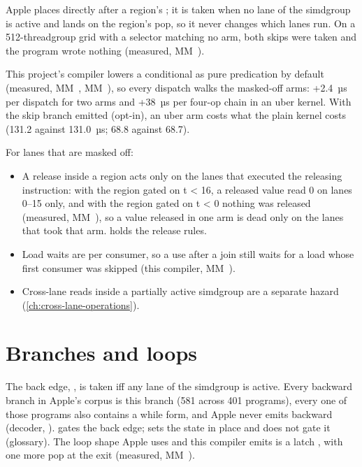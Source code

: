 Apple places 
directly after a region's ; it is taken when no lane of the simdgroup is active and lands
on the region's pop, so it never changes which lanes run. On a 512-threadgroup grid with a selector matching no arm, both skips were taken and the program wrote
nothing (measured, MM~).

This project's compiler lowers a
conditional as pure predication by default (measured, MM~, MM~), so every dispatch walks the masked-off arms: +2.4~µs per dispatch for two arms
and +38~µs per four-op chain in an uber kernel. With the skip branch emitted (opt-in), an uber arm costs what the plain
kernel costs (131.2 against 131.0~µs; 68.8 against 68.7).

For lanes that are masked off:

\begin{itemize}
\item A release inside a region acts only on the lanes that executed the releasing instruction: with the region gated on
  t < 16, a released value read 0 on lanes 0–15 only, and with the region gated on t < 0 nothing was released (measured,
  MM~), so a value released in one arm is dead only on the lanes that took that arm.  holds the release rules.
\item Load waits are per consumer, so a use after a join still waits for a load whose first consumer was skipped (this
  compiler, MM~).
\item Cross-lane reads inside a partially active simdgroup are a separate hazard (\cref{ch:cross-lane-operations}).
\end{itemize}

\section{Branches and loops}\label{sec:branches-back-edges}

The back edge, , is taken iff any lane of the simdgroup is active. Every backward
branch in Apple's corpus is this branch (581 across 401 programs), every one of those programs also contains a while form, and
Apple never emits  backward (decoder, ).  gates the
back edge;  sets the state in place and does not gate it (glossary). The loop shape Apple uses and this compiler emits is a latch , with one more pop at the exit (measured, MM~).

